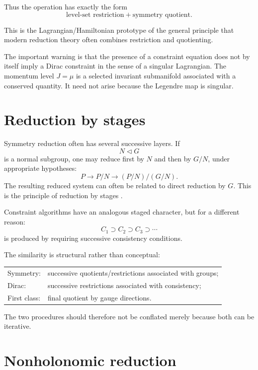 \documentclass[11pt,a4paper]{article}
\theoremstyle{definition}
\begin{document}
Thus the operation has exactly the form
\[
        \boxed{
        \text{level-set restriction}
        +
        \text{symmetry quotient}.
        }
\]

This is the Lagrangian/Hamiltonian prototype of the general principle that
modern reduction theory often combines restriction and quotienting.

The important warning is that the presence of a constraint equation does not
by itself imply a Dirac constraint in the sense of a singular Lagrangian.
The momentum level $J=\mu$ is a selected invariant submanifold associated with
a conserved quantity.  It need not arise because the Legendre map is singular.

\section{Reduction by stages}

Symmetry reduction often has several successive layers.  If
\[
        N\triangleleft G
\]
is a normal subgroup, one may reduce first by $N$ and then by $G/N$, under
appropriate hypotheses:
\[
        P
        \longrightarrow
        P/N
        \longrightarrow
        (P/N)/(G/N).
\]
The resulting reduced system can often be related to direct reduction by
$G$.  This is the principle of reduction by stages
\cite{CendraMarsdenRatiu2001}.

Constraint algorithms have an analogous staged character, but for a different
reason:
\[
        C_1\supset C_2\supset C_3\supset\cdots
\]
is produced by requiring successive consistency conditions.

The similarity is structural rather than conceptual:
\begin{center}
\begin{tabular}{ll}
Symmetry: & successive quotients/restrictions associated with groups;\\
Dirac: & successive restrictions associated with consistency;\\
First class: & final quotient by gauge directions.
\end{tabular}
\end{center}

The two procedures should therefore not be conflated merely because both can
be iterative.

\section{Nonholonomic reduction}
\end{document}
